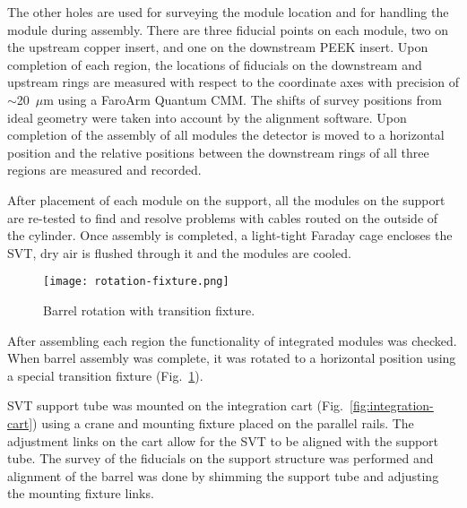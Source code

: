 The other holes are used for surveying the module location and for handling the module during assembly. There are three fiducial points on each module, two on the upstream copper insert, and one on the downstream PEEK insert. Upon completion of each region, the locations of fiducials on the downstream and upstream rings are measured with respect to the coordinate axes with precision of $\sim$20~$\mu$m using a FaroArm Quantum CMM. The shifts of survey positions from ideal geometry were taken into account by the alignment software. Upon completion of the assembly of all modules the detector is moved to a horizontal position and the relative positions between the downstream rings of all three regions are measured and recorded.

After placement of each module on the support, all the modules on the support are re-tested to find and resolve problems with cables routed on the outside of the cylinder. Once assembly is completed, a light-tight Faraday cage encloses the SVT, dry air is flushed through it and the modules are cooled. 

%

\begin{figure}[hbt] 
\centering 
\texttt{[image: rotation-fixture.png]}
\caption{Barrel rotation with transition fixture.}
\label{fig:rotation-fixture}
\end{figure}

After assembling each region the functionality of integrated modules was checked. When barrel assembly was complete, it was rotated to a horizontal position using a special transition fixture (Fig.~\ref{fig:rotation-fixture}). 

SVT support tube was mounted on the integration cart (Fig.~\ref{fig:integration-cart}) using a crane and mounting fixture placed on the parallel rails. The adjustment links on the cart allow for the SVT to be aligned with the support tube. The survey of the fiducials on the support structure was performed and alignment of the barrel was done by shimming the support tube and adjusting the mounting fixture links. 

